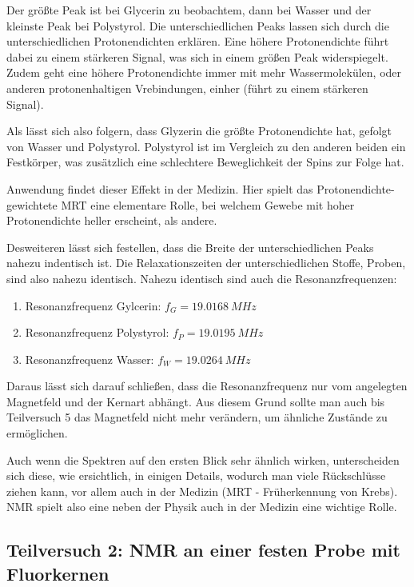 \documentclass{article}
\begin{document}
Der größte Peak ist bei Glycerin zu beobachtem, dann bei Wasser und der kleinste Peak bei Polystyrol. Die unterschiedlichen Peaks lassen sich durch die unterschiedlichen Protonendichten erklären. Eine höhere Protonendichte führt dabei zu einem stärkeren Signal, was sich in einem größen Peak widerspiegelt. Zudem geht eine höhere Protonendichte immer mit mehr Wassermolekülen, oder anderen protonenhaltigen Vrebindungen, einher (führt zu einem stärkeren Signal). 

Als lässt sich also folgern, dass Glyzerin die größte Protonendichte hat, gefolgt von Wasser und Polystyrol. Polystyrol ist im Vergleich zu den anderen beiden ein Festkörper, was zusätzlich eine schlechtere Beweglichkeit der Spins zur Folge hat.

Anwendung findet dieser Effekt in der Medizin. Hier spielt das Protonendichte-gewichtete MRT eine elementare Rolle, bei welchem Gewebe mit hoher Protonendichte heller erscheint, als andere. \cite{doc}

Desweiteren lässt sich festellen, dass die Breite der unterschiedlichen Peaks nahezu indentisch ist. Die Relaxationszeiten der unterschiedlichen Stoffe, Proben, sind also nahezu identisch. Nahezu identisch sind auch die Resonanzfrequenzen: 
\begin{enumerate}
    \item Resonanzfrequenz Gylcerin: $f_G= \qty{19.0168}{MHz}$
    \item Resonanzfrequenz Polystyrol: $f_P=\qty{19.0195}{MHz}$
    \item Resonanzfrequenz Wasser: $f_W=\qty{19.0264}{MHz}$
\end{enumerate}
Daraus lässt sich darauf schließen, dass die Resonanzfrequenz nur vom angelegten Magnetfeld und der Kernart abhängt. Aus diesem Grund sollte man auch bis Teilversuch 5 das Magnetfeld nicht mehr verändern, um ähnliche Zustände zu ermöglichen.

Auch wenn die Spektren auf den ersten Blick sehr ähnlich wirken, unterscheiden sich diese, wie ersichtlich, in einigen Details, wodurch man viele Rückschlüsse ziehen kann, vor allem auch in der Medizin (MRT - Früherkennung von Krebs). NMR spielt also eine neben der Physik auch in der Medizin eine wichtige Rolle. 

\newpage

\subsection{Teilversuch 2: NMR an einer festen Probe mit Fluorkernen}
\end{document}
